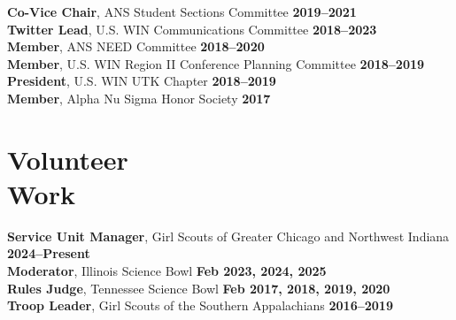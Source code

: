 \documentclass[margin,line]{resume}
\begin{document}
\begin{resume}
        \textbf{Co-Vice Chair}, ANS Student Sections Committee \hfill \textbf{2019--2021}\vspace{.5mm}\\%
        \textbf{Twitter Lead}, U.S. WIN Communications Committee  \hfill \textbf{2018--2023}\vspace{.5mm}\\%
        \textbf{Member}, ANS NEED Committee \hfill \textbf{2018--2020}\vspace{.5mm}\\%
        \textbf{Member}, U.S. WIN Region II Conference Planning Committee  \hfill \textbf{2018--2019}\vspace{.5mm}\\%
        \textbf{President}, U.S. WIN UTK Chapter  \hfill \textbf{2018--2019}\vspace{.5mm}\\%
        \textbf{Member}, Alpha Nu Sigma Honor Society \hfill \textbf{2017}\vspace{.5mm}%
    
    \section{\mysidestyle Volunteer\\Work}
        \textbf{Service Unit Manager}, Girl Scouts of Greater Chicago and Northwest Indiana \hfill \textbf{2024--Present}\\
        \textbf{Moderator}, Illinois Science Bowl \hfill\textbf{Feb 2023, 2024, 2025}\\
        \textbf{Rules Judge}, Tennessee Science Bowl \hfill \textbf{Feb 2017, 2018, 2019, 2020}\\
        \textbf{Troop Leader}, Girl Scouts of the Southern Appalachians \hfill \textbf{2016--2019}%
                

\end{resume}
\end{document}
